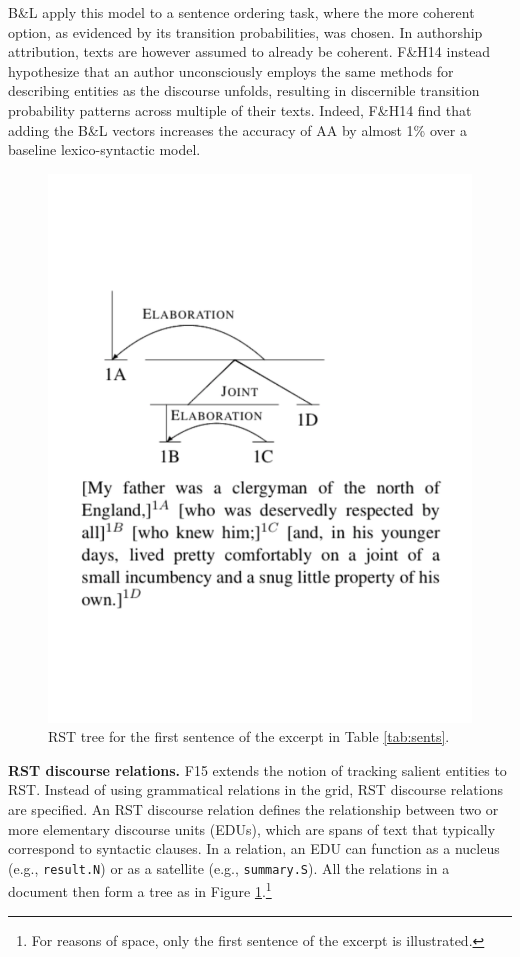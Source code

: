 B\&L apply this model to a sentence ordering task, where the more coherent option, as evidenced by its transition probabilities, was chosen. In authorship attribution, texts are however assumed to already be coherent. F\&H14 instead hypothesize that an author unconsciously employs the same methods for describing entities as the discourse unfolds, resulting in discernible transition probability patterns across multiple of their texts. Indeed, F\&H14 find that adding the B\&L vectors increases the accuracy of AA by almost 1\% over a baseline lexico-syntactic model.
\medskip

\begin{figure}
\vspace{-5em}
\includegraphics[scale=0.3]{plots/longer2_rstTree.pdf}
\vspace{-5.5em}
\caption{RST tree for the first sentence of the excerpt in Table \ref{tab:sents}.}
\label{fig:rstTree}
\end{figure}
\noindent\textbf{RST discourse relations.} F15 extends the notion of tracking salient entities to RST. Instead of using grammatical relations in the grid, RST discourse relations are specified. An RST discourse relation defines the relationship between two or more elementary discourse units (EDUs), which are spans of text that typically correspond to syntactic clauses. In a relation, an EDU can function as a nucleus (e.g., \texttt{result.N}) or as a satellite (e.g., \texttt{summary.S}). All the relations in a document then form a tree as in Figure \ref{fig:rstTree}.\footnote{For reasons of space, only the first sentence of the excerpt is illustrated.}



